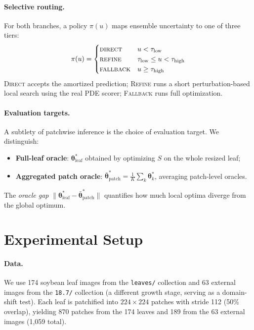 \documentclass[11pt]{article}
\begin{document}
\paragraph{Selective routing.}
For both branches, a policy $\pi(u)$ maps ensemble uncertainty to one of three tiers:
\begin{equation}
\pi(u) = \begin{cases} \textsc{direct} & u < \tau_{\mathrm{low}} \\ \textsc{refine} & \tau_{\mathrm{low}} \le u < \tau_{\mathrm{high}} \\ \textsc{fallback} & u \ge \tau_{\mathrm{high}} \end{cases}
\end{equation}
\textsc{Direct} accepts the amortized prediction; \textsc{Refine} runs a short perturbation-based local search using the real PDE scorer; \textsc{Fallback} runs full optimization.

\paragraph{Evaluation targets.}
A subtlety of patchwise inference is the choice of evaluation target.  We distinguish:
\begin{itemize}[leftmargin=1.5em,itemsep=1pt]
\item \textbf{Full-leaf oracle}: $\boldsymbol{\theta}^*_{\mathrm{leaf}}$ obtained by optimizing $S$ on the whole resized leaf;
\item \textbf{Aggregated patch oracle}: $\bar{\boldsymbol{\theta}}^*_{\mathrm{patch}} = \frac{1}{K}\sum_k \boldsymbol{\theta}^*_k$, averaging patch-level oracles.
\end{itemize}
The \emph{oracle gap} $\|\boldsymbol{\theta}^*_{\mathrm{leaf}} - \bar{\boldsymbol{\theta}}^*_{\mathrm{patch}}\|$ quantifies how much local optima diverge from the global optimum.


\section{Experimental Setup}
\label{sec:setup}

\paragraph{Data.}
We use 174 soybean leaf images from the \texttt{leaves/} collection and 63 external images from the \texttt{18.7/} collection (a different growth stage, serving as a domain-shift test).  Each leaf is patchified into $224{\times}224$ patches with stride 112 (50\% overlap), yielding 870 patches from the 174 leaves and 189 from the 63 external images (1{,}059 total).
\end{document}
